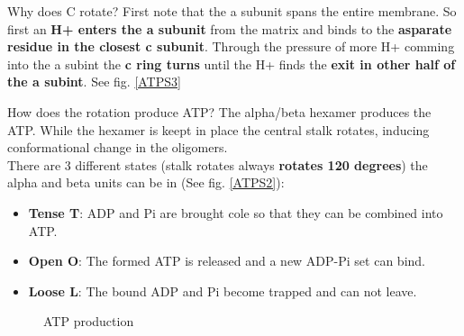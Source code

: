 \documentclass[../main.tex]{subfiles}
\begin{document}
\begin{RemarkWithTitel}{Why does C rotate?}
	First note that the a subunit spans the entire membrane. So first an \textbf{H+ enters the a subunit} from the matrix and binds to the \textbf{asparate residue in the closest c subunit}. Through the pressure of more H+ comming into the a subint the \textbf{c ring turns} until the H+ finds the \textbf{exit in other half of the a subint}. See fig. \ref{ATPS3}
\end{RemarkWithTitel}

\begin{RemarkWithTitel}{How does the rotation produce ATP?}
	The alpha/beta hexamer produces the ATP. While the hexamer is keept in place the central stalk rotates, inducing conformational change in the oligomers.\\ 
	\indent There are 3 different states (stalk rotates always \textbf{rotates 120 degrees}) the alpha and beta units can be in (See fig. \ref{ATPS2}): 
	\begin{itemize}
		\item \textbf{Tense T}: ADP and Pi are brought cole so that they can be combined into ATP.
		
		\item \textbf{Open O}: The formed ATP is released and a new ADP-Pi set can bind.
		
		\item \textbf{Loose L}: The bound ADP and Pi become trapped and can not leave. 
	\end{itemize}
\end{RemarkWithTitel}
	
\begin{figure}[H]
	\centering
	\caption{ATP production}
\end{figure}
\end{document}
